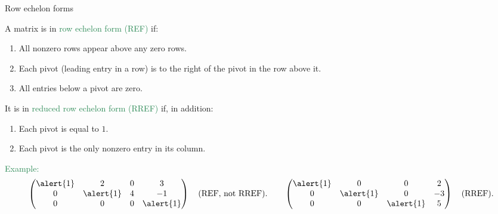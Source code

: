 \documentclass{beamer}
\begin{document}
\begin{frame}{Row echelon forms}

A matrix is in \textcolor{SeaGreen}{row echelon form (REF)} if:
\begin{enumerate}
\item All nonzero rows appear above any zero rows.
\item Each \alert{pivot} (leading entry in a row) is to the right of the pivot in the row above it.
\item All entries below a pivot are zero.
\end{enumerate}

\medskip
It is in \textcolor{SeaGreen}{reduced row echelon form (RREF)} if, in addition:
\begin{enumerate}
\item Each pivot is equal to $1$.
\item Each pivot is the only nonzero entry in its column.
\end{enumerate}

\medskip
\textcolor{SeaGreen}{Example:}
\[
\begin{pmatrix}
\alert{1} & 2 & 0 & 3 \\
0 & \alert{1} & 4 & -1 \\
0 & 0 & 0 & \alert{1}
\end{pmatrix}
\quad \text{(REF, not RREF).}
\quad\quad
\begin{pmatrix}
\alert{1} & 0 & 0 & 2 \\
0 & \alert{1} & 0 & -3 \\
0 & 0 & \alert{1} & 5
\end{pmatrix}
\quad \text{(RREF).}
\]
\end{frame}
\end{document}
